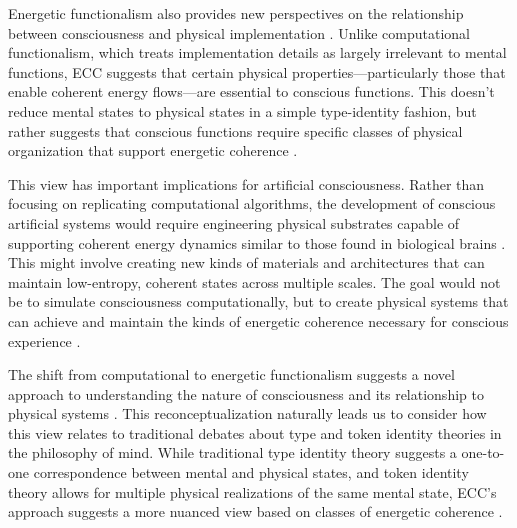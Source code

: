 Energetic functionalism also provides new perspectives on the relationship between consciousness and physical implementation \cite{mossio2015biological}. Unlike computational functionalism, which treats implementation details as largely irrelevant to mental functions, ECC suggests that certain physical properties—particularly those that enable coherent energy flows—are essential to conscious functions. This doesn't reduce mental states to physical states in a simple type-identity fashion, but rather suggests that conscious functions require specific classes of physical organization that support energetic coherence \cite{dupre2012processes}.

This view has important implications for artificial consciousness. Rather than focusing on replicating computational algorithms, the development of conscious artificial systems would require engineering physical substrates capable of supporting coherent energy dynamics similar to those found in biological brains \cite{chemero2013radical}. This might involve creating new kinds of materials and architectures that can maintain low-entropy, coherent states across multiple scales. The goal would not be to simulate consciousness computationally, but to create physical systems that can achieve and maintain the kinds of energetic coherence necessary for conscious experience \cite{hutto2012radicalizing}.

The shift from computational to energetic functionalism suggests a novel approach to understanding the nature of consciousness and its relationship to physical systems \cite{nicholson2018everything}. This reconceptualization naturally leads us to consider how this view relates to traditional debates about type and token identity theories in the philosophy of mind. While traditional type identity theory suggests a one-to-one correspondence between mental and physical states, and token identity theory allows for multiple physical realizations of the same mental state, ECC's approach suggests a more nuanced view based on classes of energetic coherence \cite{gillett2016reduction}.